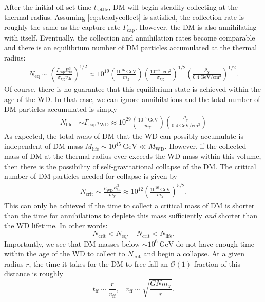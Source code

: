 \documentclass[preprintnumbers,amsmath,amssymb,prd,superscriptaddress]{revtex4}
\newcommand{\OO}{\mathcal{O}}
\newcommand{\GeV}{\text{GeV}}
\newcommand{\cm}{\text{cm}}
\def\r{\right)}
\def\l{\left(}
\begin{document}
After the initial off-set time $t_\text{settle}$, DM will begin steadily collecting at the thermal radius.
Assuming \eqref{eq:steadycollect} is satisfied, the collection rate is roughly the same as the capture rate $\Gamma_\text{cap}$. 
However, the DM is also annihilating with itself.
Eventually, the collection and annihilation rates become comparable and there is an equilibrium number of DM particles accumulated at the thermal radius:
\begin{align}
N_\text{eq} \sim \l \frac{\Gamma_\text{cap} R_\text{th}^3}{\sigma_{\chi \chi} v_\text{th}} \r^{1/2} \approx 10^{19} \l \frac{10^{16} ~\GeV}{m_\chi} \r \l \frac{10^{-30} ~\cm^2}{\sigma_{\chi \chi}} \r^{1/2} \l \frac{\rho_\chi}{0.4 ~\GeV/\cm^3} \r^{1/2}.
\end{align}
Of course, there is no guarantee that this equilibrium state is achieved within the age of the WD. 
In that case, we can ignore annihilations and the total number of DM particles accumulated is simply
\begin{align}
N_\text{life} &\sim \Gamma_\text{cap} \tau_\text{WD} \approx 10^{29}  \l \frac{10^{16} ~\GeV}{m_\chi} \r \l \frac{\rho_\chi}{0.4 ~\GeV/\cm^3} \r
\end{align}
As expected, the total \emph{mass} of DM that the WD can possibly accumulate is independent of DM mass $M_\text{life} \sim 10^{45} ~\GeV \ll M_\text{WD}$. 
However, if the collected mass of DM at the thermal radius ever exceeds the WD mass within this volume, then there is the possibility of self-gravitational collapse of the DM.
The critical number of DM particles needed for collapse is given by
\begin{align}
\label{eq:Ncore}
    N_\text{crit} \sim \frac{\rho_\text{WD} R^3_\text{th}}{m_\chi} \approx 10^{12} \l \frac{10^{16} ~\GeV}{m_\chi} \r^{5/2}. \nonumber
\end{align}
This can only be achieved if the time to collect a critical mass of DM is shorter than the time for annihilations to deplete this mass sufficiently \emph{and} shorter than the WD lifetime. 
In other words:
\begin{equation}
\label{eq:collapsecondition}
N_\text{crit} < N_\text{eq}, ~~~~ N_\text{crit} < N_\text{life}.
\end{equation}
Importantly, we see that DM masses below $\sim 10^{6} ~\GeV$ do not have enough time within the age of the WD to collect to $N_\text{crit}$ and begin a collapse. 
At a given radius $r$, the time it takes for the DM to free-fall an $\OO(1)$ fraction of this distance is roughly
\begin{equation}
\label{eq:freefalltime}
t_\text{ff} \sim \frac{r}{v_\text{ff}}, ~~~~ v_\text{ff} \sim \sqrt{\frac{G N m_\chi}{r}}.
\end{equation}
\end{document}
